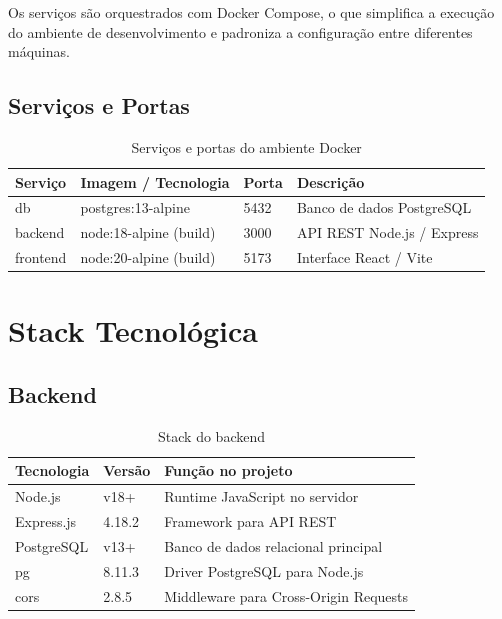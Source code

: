 \documentclass[12pt, a4paper]{article}
\newcommand{\thead}[1]{\cellcolor{tableheader}\color{white}\bfseries #1}
\newcommand{\talt}{\rowcolor{tablerowalt}}
\begin{document}
Os serviços são orquestrados com Docker Compose, o que simplifica a execução do ambiente de desenvolvimento e padroniza a configuração entre diferentes máquinas.

\subsection{Serviços e Portas}

\begin{table}[H]
\centering
\begin{tabularx}{\textwidth}{|l|l|l|X|}
\hline
\thead{Serviço} & \thead{Imagem / Tecnologia} & \thead{Porta} & \thead{Descrição} \\
\hline
db       & postgres:13-alpine      & 5432 & Banco de dados PostgreSQL \\
\talt backend  & node:18-alpine (build)  & 3000 & API REST Node.js / Express \\
frontend & node:20-alpine (build)  & 5173 & Interface React / Vite \\
\hline
\end{tabularx}
\caption{Serviços e portas do ambiente Docker}
\end{table}

\section{Stack Tecnológica}

\subsection{Backend}

\begin{table}[H]
\centering
\begin{tabularx}{\textwidth}{|l|l|X|}
\hline
\thead{Tecnologia} & \thead{Versão} & \thead{Função no projeto} \\
\hline
Node.js      & v18+   & Runtime JavaScript no servidor \\
\talt Express.js  & 4.18.2 & Framework para API REST \\
PostgreSQL   & v13+   & Banco de dados relacional principal \\
\talt pg           & 8.11.3 & Driver PostgreSQL para Node.js \\
cors         & 2.8.5  & Middleware para Cross-Origin Requests \\
\hline
\end{tabularx}
\caption{Stack do backend}
\end{table}
\end{document}
